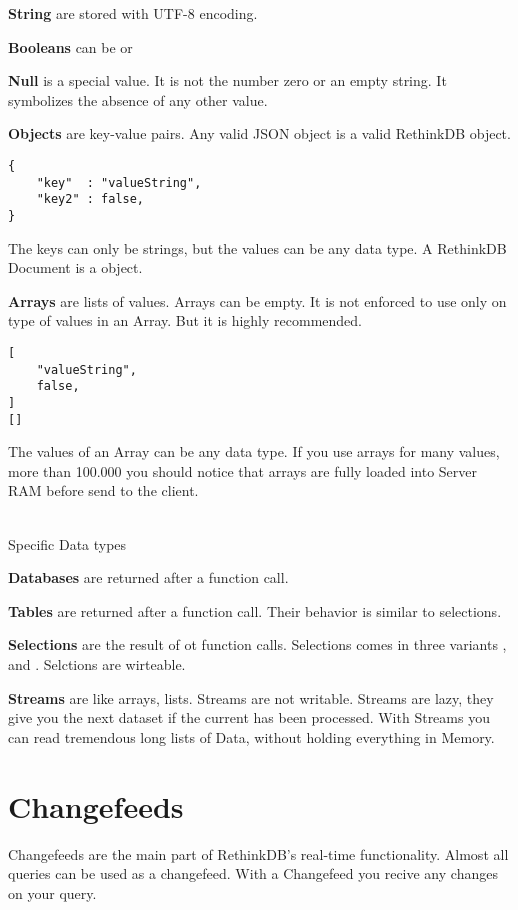 \textbf{String} are stored with UTF-8 encoding.

\textbf{Booleans} can be  or 

\textbf{Null} is a special value.
It is not the number zero or an empty string.
It symbolizes the absence of any other value.

\textbf{Objects} are key-value pairs.
Any valid JSON object is a valid RethinkDB object.
\begin{lstlisting}[frame=single, caption=example Object, label=refdoc]
{
	"key"  : "valueString",
	"key2" : false,
}
\end{lstlisting}
The keys can only be strings, but the values can be any data type.
A RethinkDB Document is a object.

\textbf{Arrays} are lists of values.
Arrays can be empty.
It is not enforced to use only on type of values in an Array.
But it is highly recommended.
\begin{lstlisting}[frame=single, caption=example Arrays, label=refdoc]
[
	"valueString",
	false,
]
[]
\end{lstlisting}
The values of an Array can be any data type.
If you use arrays for many values, more than 100.000 you should notice that arrays are fully loaded into Server RAM before send to the client.

\\
Specific Data types

\textbf{Databases} are returned after a  function call.

\textbf{Tables} are returned after a  function call.
Their behavior is similar to selections.

\textbf{Selections} are the result of  ot  function calls.
Selections comes in three variants ,  and .
Selctions are wirteable.

\textbf{Streams} are like arrays, lists.
Streams are not writable.
Streams are lazy, they give you the next dataset if the current has been processed.
With Streams you can read tremendous long lists of Data, without holding everything in Memory.


\section{Changefeeds}

Changefeeds are the main part of RethinkDB's real-time functionality.
Almost all queries can be used as a changefeed.
With a Changefeed you recive any changes on your query.

